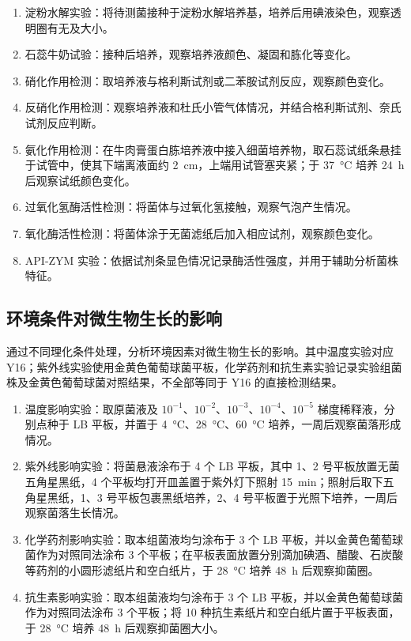 \documentclass[UTF8,a4paper,12pt,fontset=none]{ctexart}
\numberwithin{figure}{section}
\begin{document}
\begin{enumerate}[label=\arabic*.]
    \item 淀粉水解实验：将待测菌接种于淀粉水解培养基，培养后用碘液染色，观察透明圈有无及大小。
    \item 石蕊牛奶试验：接种后培养，观察培养液颜色、凝固和胨化等变化。
    \item 硝化作用检测：取培养液与格利斯试剂或二苯胺试剂反应，观察颜色变化。
    \item 反硝化作用检测：观察培养液和杜氏小管气体情况，并结合格利斯试剂、奈氏试剂反应判断。
    \item 氨化作用检测：在牛肉膏蛋白胨培养液中接入细菌培养物，取石蕊试纸条悬挂于试管中，使其下端离液面约 \SI{2}{cm}，上端用试管塞夹紧；于 \SI{37}{\celsius} 培养 \SI{24}{h} 后观察试纸颜色变化。
    \item 过氧化氢酶活性检测：将菌体与过氧化氢接触，观察气泡产生情况。
    \item 氧化酶活性检测：将菌体涂于无菌滤纸后加入相应试剂，观察颜色变化。
    \item API-ZYM 实验：依据试剂条显色情况记录酶活性强度，并用于辅助分析菌株特征。
\end{enumerate}

\subsection{环境条件对微生物生长的影响}

通过不同理化条件处理，分析环境因素对微生物生长的影响。其中温度实验对应 Y16；紫外线实验使用金黄色葡萄球菌平板，化学药剂和抗生素实验记录实验组菌株及金黄色葡萄球菌对照结果，不全部等同于 Y16 的直接检测结果。

\begin{enumerate}[label=\arabic*.]
    \item 温度影响实验：取原菌液及 $10^{-1}$、$10^{-2}$、$10^{-3}$、$10^{-4}$、$10^{-5}$ 梯度稀释液，分别点种于 LB 平板，并置于 \SI{4}{\celsius}、\SI{28}{\celsius}、\SI{60}{\celsius} 培养，一周后观察菌落形成情况。
    \item 紫外线影响实验：将菌悬液涂布于 4 个 LB 平板，其中 1、2 号平板放置无菌五角星黑纸，4 个平板均打开皿盖置于紫外灯下照射 \SI{15}{min}；照射后取下五角星黑纸，1、3 号平板包裹黑纸培养，2、4 号平板置于光照下培养，一周后观察菌落生长情况。
    \item 化学药剂影响实验：取本组菌液均匀涂布于 3 个 LB 平板，并以金黄色葡萄球菌作为对照同法涂布 3 个平板；在平板表面放置分别滴加碘酒、醋酸、石炭酸等药剂的小圆形滤纸片和空白纸片，于 \SI{28}{\celsius} 培养 \SI{48}{h} 后观察抑菌圈。
    \item 抗生素影响实验：取本组菌液均匀涂布于 3 个 LB 平板，并以金黄色葡萄球菌作为对照同法涂布 3 个平板；将 10 种抗生素纸片和空白纸片置于平板表面，于 \SI{28}{\celsius} 培养 \SI{48}{h} 后观察抑菌圈大小。
\end{enumerate}
\end{document}
